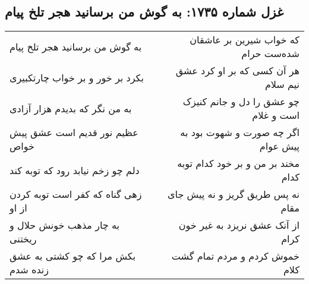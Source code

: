 \begin{center}
\section*{غزل شماره ۱۷۳۵: به گوش من برسانید هجر تلخ پیام}
\label{sec:1735}
\begin{longtable}{l p{0.5cm} r}
به گوش من برسانید هجر تلخ پیام
&&
که خواب شیرین بر عاشقان شده‌ست حرام
\\
بکرد بر خور و بر خواب چارتکبیری
&&
هر آن کسی که بر او کرد عشق نیم سلام
\\
به من نگر که بدیدم هزار آزادی
&&
چو عشق را دل و جانم کنیزک است و غلام
\\
عظیم نور قدیم است عشق پیش خواص
&&
اگر چه صورت و شهوت بود به پیش عوام
\\
دلم چو زخم نیابد رود که توبه کند
&&
مخند بر من و بر خود کدام توبه کدام
\\
زهی گناه که کفر است توبه کردن از او
&&
نه پس طریق گریز و نه پیش جای مقام
\\
به چار مذهب خونش حلال و ریختنی
&&
از آنک عشق نریزد به غیر خون کرام
\\
بکش مرا که چو کشتی به عشق زنده شدم
&&
خموش کردم و مردم تمام گشت کلام
\\
\end{longtable}
\end{center}
